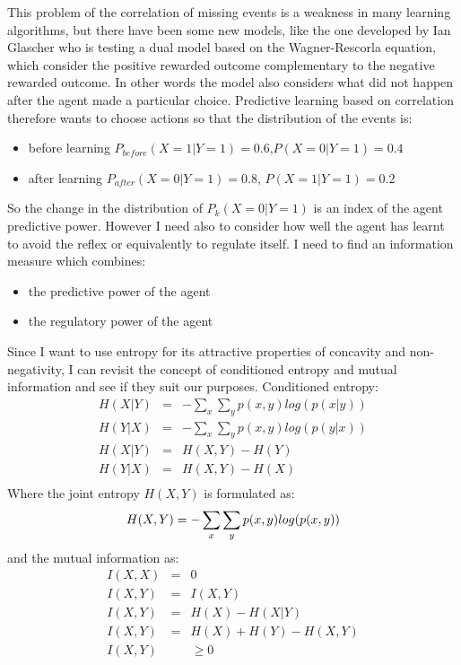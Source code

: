 This problem of the correlation of missing events is a weakness in many learning algorithms,
 but there have been some new models, like the one developed by Ian Glascher who is testing 
a dual model based on the Wagner-Rescorla equation, which consider the positive rewarded 
outcome complementary to the negative rewarded outcome. In other words the model also considers
 what did not happen after the agent made a particular choice.
Predictive learning based on correlation therefore wants to choose actions so that the 
distribution of the events is:
\begin{itemize}
 \item before learning $P_{before}(X=1|Y=1)=0.6$,$P(X=0|Y=1)=0.4$
 \item after learning $P_{after}(X=0|Y=1)=0.8$, $P(X=1|Y=1)=0.2$
\end{itemize}
So the change in the distribution of $P_{k}(X=0|Y=1)$ is an index of the agent predictive power.
However I need also to consider how well the agent has learnt to avoid the reflex or equivalently to regulate itself.
I need to find an information measure which combines:
\begin{itemize}
 \item the predictive power of the agent
 \item the regulatory power of the agent
\end{itemize}
Since I want to use entropy for its attractive properties of concavity and non-negativity,
I can revisit the concept of conditioned entropy and mutual information and see if they suit our purposes.
Conditioned entropy:
\begin{eqnarray}
H(X|Y)&=&-\sum_x \sum_y p(x,y) log (p(x|y))\\
H(Y|X)&=&-\sum_x \sum_y p(x,y) log (p(y|x))\\
H(X|Y)&=& H(X,Y)-H(Y)\\
H(Y|X)&=& H(X,Y)-H(X)\\
\end{eqnarray}
Where the joint entropy $H(X,Y)$ is formulated as:
\begin{equation}
H(X,Y)=-\sum_x \sum_y p(x,y) log (p(x,y))\\
\end{equation}
and the mutual information as:
\begin{eqnarray}
I(X,X)&=&0\\
I(X,Y)&=&I(X,Y)\\
I(X,Y)&=&H(X)-H(X|Y)\\
I(X,Y)&=&H(X)+H(Y)-H(X,Y)\\
I(X,Y)&&\geqslant 0
\end{eqnarray}
